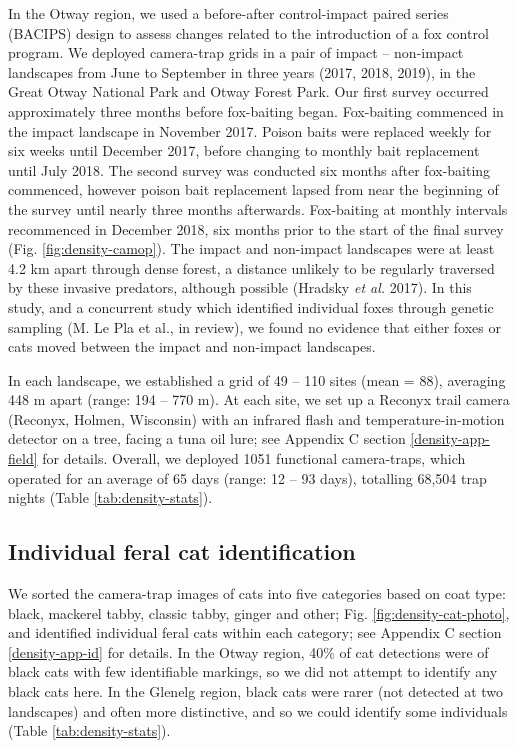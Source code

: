 \documentclass[11pt,a4paper,titlepage,twoside,openright]{style/unimelbthesis}
\begin{document}
\begin{mainmatter}
In the Otway region, we used a before-after control-impact paired series (BACIPS) design to assess changes related to the introduction of a fox control program. We deployed camera-trap grids in a pair of impact -- non-impact landscapes from June to September in three years (2017, 2018, 2019), in the Great Otway National Park and Otway Forest Park. Our first survey occurred approximately three months before fox-baiting began. Fox-baiting commenced in the impact landscape in November 2017. Poison baits were replaced weekly for six weeks until December 2017, before changing to monthly bait replacement until July 2018. The second survey was conducted six months after fox-baiting commenced, however poison bait replacement lapsed from near the beginning of the survey until nearly three months afterwards. Fox-baiting at monthly intervals recommenced in December 2018, six months prior to the start of the final survey (Fig. \ref{fig:density-camop}). The impact and non-impact landscapes were at least 4.2 km apart through dense forest, a distance unlikely to be regularly traversed by these invasive predators, although possible (Hradsky \emph{et al.} 2017). In this study, and a concurrent study which identified individual foxes through genetic sampling (M. Le Pla et al., in review), we found no evidence that either foxes or cats moved between the impact and non-impact landscapes.

In each landscape, we established a grid of 49 -- 110 sites (mean = 88), averaging 448 m apart (range: 194 -- 770 m). At each site, we set up a Reconyx trail camera (Reconyx, Holmen, Wisconsin) with an infrared flash and temperature-in-motion detector on a tree, facing a tuna oil lure; see Appendix C section \ref{density-app-field} for details. Overall, we deployed 1051 functional camera-traps, which operated for an average of 65 days (range: 12 -- 93 days), totalling 68,504 trap nights (Table \ref{tab:density-stats}).

\hypertarget{individual-feral-cat-identification}{%
\subsection{Individual feral cat identification}\label{individual-feral-cat-identification}}

We sorted the camera-trap images of cats into five categories based on coat type: black, mackerel tabby, classic tabby, ginger and other; Fig. \ref{fig:density-cat-photo}, and identified individual feral cats within each category; see Appendix C section \ref{density-app-id} for details. In the Otway region, 40\% of cat detections were of black cats with few identifiable markings, so we did not attempt to identify any black cats here. In the Glenelg region, black cats were rarer (not detected at two landscapes) and often more distinctive, and so we could identify some individuals (Table \ref{tab:density-stats}).


\end{mainmatter}
\end{document}
